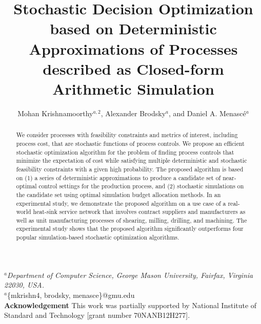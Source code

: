 \documentclass[a4paper, 12pt]{article} %
\title{\textbf{Stochastic Decision Optimization based on Deterministic Approximations of Processes described as Closed-form Arithmetic Simulation }} %
\author{Mohan Krishnamoorthy$^{a,2}$, Alexander Brodsky$^a$, and Daniel A. Menasc\'e$^{a}$} %
\makeatletter
\renewcommand{\maketitle}{ %
\begin{flushleft} 
{\large\@title\footnotemark[1]} %

\vspace{20pt} %

{\large\@author} %
\end{flushleft}
}
\makeatother
\begin{document}
\pagestyle{empty}
\maketitle %

\begin{flushleft} 
\vspace{10pt}
$^a$\textit{Department of Computer Science, George Mason University, Fairfax, Virginia 22030, USA.
}\\
\vspace{20pt}
$^a$\{mkrishn4, brodsky, menasce\}@gmu.edu \\
\vspace{20pt}
\textbf{Acknowledgement}\newline
This work was partially supported by National Institute of Standard and Technology [grant number 70NANB12H277]. \newline
\vspace{20pt}

\end{flushleft} 

\newpage
\pagestyle{plain}
\setcounter{page}{1}
\noindent{\large \@title }
\vspace{10pt}


\begin{abstract}{\small\noindent
We consider processes with feasibility constraints and metrics of interest, including process cost, that are stochastic functions of process controls. We propose an efficient stochastic optimization algorithm for the problem of finding process controls that minimize the expectation of cost while satisfying multiple deterministic and stochastic feasibility constraints with a given high probability. The proposed algorithm is based on (1) a series of deterministic approximations to produce a candidate set of near-optimal control settings for the production process, and (2) stochastic simulations on the candidate set using optimal simulation budget allocation methods. In an experimental study, we demonstrate the proposed algorithm on a use case of a real-world heat-sink service network that involves contract suppliers and manufacturers as well as unit manufacturing processes of shearing, milling, drilling, and machining. The experimental study shows that the proposed algorithm significantly outperforms four popular simulation-based stochastic optimization algorithms.
}
\end{abstract}
\end{document}
